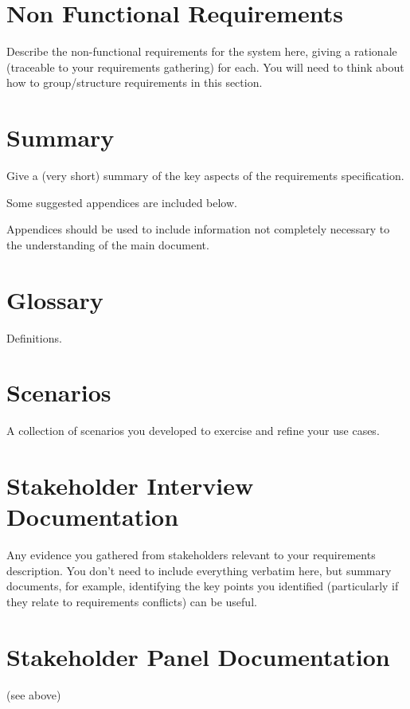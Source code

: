 \documentclass{l3deliverable}
\begin{document}

\section{Non Functional Requirements}

Describe the non-functional requirements for the system here, giving a
rationale (traceable to your requirements gathering) for each.  You
will need to think about how to group/structure requirements in this
section.


\section{Summary}

Give a (very short) summary of the key aspects of the requirements
specification.


\appendix

Some suggested appendices are included below.

Appendices should be used to include information not completely
necessary to the understanding of the main document.

\section{Glossary}

Definitions.

\section{Scenarios}

A collection of scenarios you developed to exercise and refine your
use cases.

\section{Stakeholder Interview Documentation}

Any evidence you gathered from stakeholders relevant to your
requirements description.  You don't need to include everything
verbatim here, but summary documents, for example, identifying the key
points you identified (particularly if they relate to requirements
conflicts) can be useful.

\section{Stakeholder Panel Documentation}

(see above)

\end{document}
